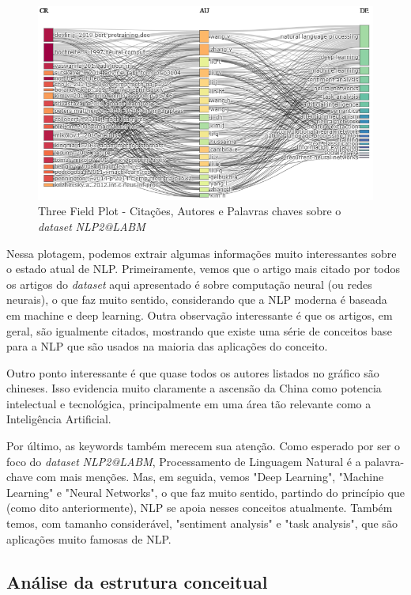  \begin{figure}
    \centering
    \includegraphics[width=1\textwidth]{experiments/ABMHub/PesquisaBibliometrica/NLP/tfp1.png}
    \caption{Three Field Plot - Citações, Autores e Palavras chaves sobre o \textit{dataset} \textit{NLP2@LABM}}
    \label{fig:ABMHub:TFP}
\end{figure}

Nessa plotagem, podemos extrair algumas informações muito interessantes sobre o estado atual de NLP. Primeiramente, vemos que o artigo mais citado por todos os artigos do \textit{dataset} aqui apresentado é sobre computação neural (ou redes neurais), o que faz muito sentido, considerando que a NLP moderna é baseada em machine e deep learning. Outra observação interessante é que os artigos, em geral, são igualmente citados, mostrando que existe uma série de conceitos base para a NLP que são usados na maioria das aplicações do conceito.

Outro ponto interessante é que quase todos os autores listados no gráfico são chineses. Isso evidencia muito claramente a ascensão da China como potencia intelectual e tecnológica, principalmente em uma área tão relevante como a Inteligência Artificial.

Por último, as keywords também merecem sua atenção. Como esperado por ser o foco do \textit{dataset} \textit{NLP2@LABM}, Processamento de Linguagem Natural é a palavra-chave com mais menções. Mas, em seguida, vemos "Deep Learning", "Machine Learning" e "Neural Networks", o que faz muito sentido, partindo do princípio que (como dito anteriormente), NLP se apoia nesses conceitos atualmente. Também temos, com tamanho considerável, "sentiment analysis" e "task analysis", que são aplicações muito famosas de NLP.

\subsection{Análise da estrutura conceitual}

